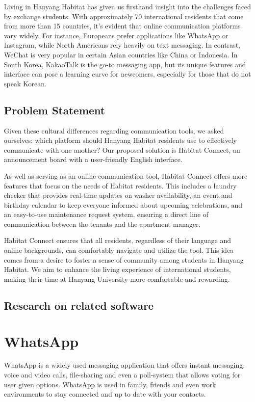 \documentclass[conference]{IEEEtran}
\begin{document}
Living in Hanyang Habitat has given us firsthand insight into the challenges faced by exchange students. With approximately 70 international residents that come from more than 15 countries, it's evident that online communication platforms vary widely. For instance, Europeans prefer applications like WhatsApp or Instagram, while North Americans rely heavily on text messaging. In contrast, WeChat is very popular in certain Asian countries like China or Indonesia. In South Korea, KakaoTalk is the go-to messaging app, but its unique features and interface can pose a learning curve for newcomers, especially for those that do not speak Korean.


\subsection{Problem Statement}
Given these cultural differences regarding communication tools, we asked ourselves: which platform should Hanyang Habitat residents use to effectively communicate with one another? Our proposed solution is Habitat Connect, an announcement board with a user-friendly English interface.

As well as serving as an online communication tool, Habitat Connect offers more features that focus on the needs of Habitat residents. This includes a laundry checker that provides real-time updates on washer availability, an event and birthday calendar to keep everyone informed about upcoming celebrations, and an easy-to-use maintenance request system, ensuring a direct line of communication between the tenants and the apartment manager.

Habitat Connect ensures that all residents, regardless of their language and online backgrounds, can comfortably navigate and utilize the tool. This idea comes from a desire to foster a sense of community among students in Hanyang Habitat. We aim to enhance the living experience of international students, making their time at Hanyang University more comfortable and rewarding.  


\subsection{Research on related software}
\section*{WhatsApp}
WhatsApp is a widely used messaging application that offers instant messaging, voice and video calls, file-sharing and even a poll-system that allows voting for user given options. WhatsApp is used in family, friends and even work environments to stay connected and up to date with your contacts.
\end{document}
